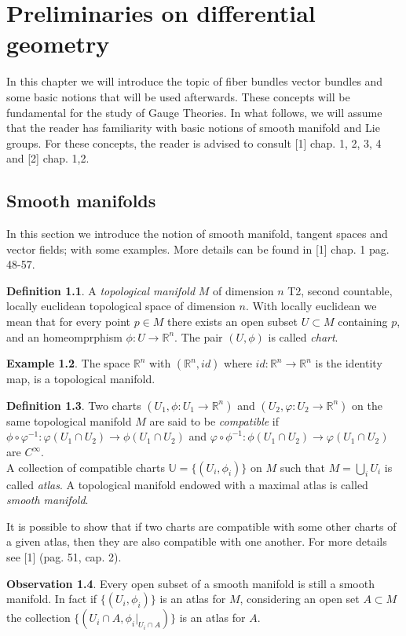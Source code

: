 \documentclass[12pt,a4paper]{report}
\theoremstyle{definition}
\newtheorem{Def}{Definition}[chapter]
\theoremstyle{Theorem}
\theoremstyle{definition}
\newtheorem{Ex}[Def]{Example}
\theoremstyle{definition}
\newtheorem{Obs}[Def]{Observation}
\begin{document}
	\tableofcontents
	\chapter{Preliminaries on differential geometry}
	In this chapter we will introduce the topic of fiber bundles vector bundles and some basic notions that will be used afterwards. These concepts will be fundamental for the study of Gauge Theories. In what follows, we will assume that the reader has familiarity with basic notions of smooth manifold and Lie groups. For these concepts, the reader is advised to consult [1] chap. 1, 2, 3, 4 and [2] chap. 1,2.
	\section{Smooth manifolds}
	In this section we introduce the notion of smooth manifold, tangent spaces and vector fields; with some examples. More details can be found in [1] chap. 1 pag. 48-57.
	\begin{Def}
		A \textit{topological manifold} $M$ of dimension $n$ T2, second countable, locally euclidean topological space of dimension $n$. With locally euclidean we mean that for every point $p\in M$ there exists an open subset $U\subset M$ containing $p$, and an homeomprphism $\phi:U\rightarrow\mathbb{R}^n$. The pair $(U,\phi)$ is called \textit{chart}. 
	\end{Def}
	\begin{Ex}
		The space $\mathbb{R}^n$ with $(\mathbb{R}^n, id)$ where $id:\mathbb{R}^n\rightarrow \mathbb{R}^n$ is the identity map, is a topological manifold. 
	\end{Ex}
	\begin{Def}
		Two charts $(U_1,\phi:U_1\rightarrow\mathbb{R}^n)$ and $(U_2,\varphi:U_2\rightarrow\mathbb{R}^n)$ on the same topological manifold $M$ are said to be \textit{compatible} if
		$\phi\circ\varphi^{-1}:\varphi(U_1\cap U_2)\rightarrow \phi(U_1\cap U_2)$ and $\varphi\circ\phi^{-1}:\phi(U_1\cap U_2)\rightarrow \varphi(U_1\cap U_2)$ are $C^\infty$.\\
		A collection of compatible charts $\mathbb{U}=\{(U_i,\phi_{i})\}$ on $M$ such that $M=\bigcup_i U_i$ is called \textit{atlas}. A topological manifold endowed with a maximal atlas is called \textit{smooth manifold}.
	\end{Def}
	It is possible to show that if two charts are compatible with some other charts of a given atlas, then they are also compatible with one another. For more details see [1] (pag. 51, cap. 2).
	\begin{Obs}\label{Obs:1.1.1}
		Every open subset of a smooth manifold is still a smooth manifold. In fact if $\{(U_i,\phi_i)\}$ is an atlas for $M$, considering an open set $A\subset M$ the collection $\{(U_i\cap A,\phi_i|_{U_i\cap A})\}$ is an atlas for $A$.
	\end{Obs}
\end{document}
